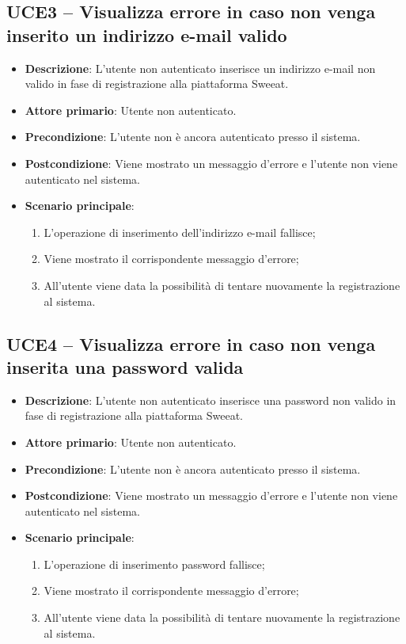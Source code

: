 \subsection{UCE3 – Visualizza errore in caso non venga inserito un indirizzo e-mail valido}
\begin{itemize}
\item \textbf{Descrizione}: L'utente non autenticato inserisce un indirizzo e-mail non valido in fase di registrazione alla piattaforma Sweeat.
\item \textbf{Attore primario}: Utente non autenticato.
\item \textbf{Precondizione}: L'utente non è ancora autenticato presso il sistema.
\item \textbf{Postcondizione}: Viene mostrato un messaggio d'errore e l'utente non viene autenticato nel sistema.

\item \textbf{Scenario principale}:
\begin{enumerate}
\item L'operazione di inserimento dell'indirizzo e-mail fallisce;
\item Viene mostrato il corrispondente messaggio d'errore;
\item All'utente viene data la possibilità di tentare nuovamente la registrazione al sistema.
\end{enumerate}
\end{itemize}

\subsection{UCE4 – Visualizza errore in caso non venga inserita una password valida}
\begin{itemize}
\item \textbf{Descrizione}: L'utente non autenticato inserisce una password non valido in fase di registrazione alla piattaforma Sweeat.
\item \textbf{Attore primario}: Utente non autenticato.
\item \textbf{Precondizione}: L'utente non è ancora autenticato presso il sistema.
\item \textbf{Postcondizione}: Viene mostrato un messaggio d'errore e l'utente non viene autenticato nel sistema.

\item \textbf{Scenario principale}:
\begin{enumerate}
\item L'operazione di inserimento password fallisce;
\item Viene mostrato il corrispondente messaggio d'errore;
\item All'utente viene data la possibilità di tentare nuovamente la registrazione al sistema.
\end{enumerate}
\end{itemize}
